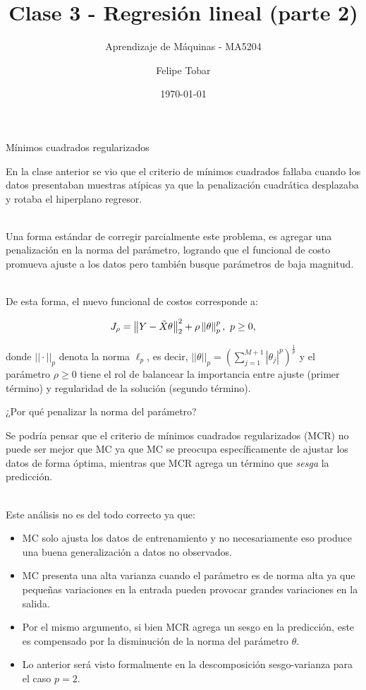 \documentclass[9pt]{beamer}
\title{Clase 3 - Regresión lineal (parte 2)}
\subtitle{Aprendizaje de Máquinas - MA5204}
\date{\today}
\author{Felipe Tobar}
\institute{Department of Mathematical Engineering \&\\ Center for Mathematical Modelling\\Universidad de Chile}
\begin{document}
\begin{frame}
  \titlepage
\end{frame}

\begin{frame}{Mínimos cuadrados regularizados}

En la clase anterior se vio que el criterio de mínimos cuadrados fallaba cuando los datos presentaban muestras atípicas ya que la penalización cuadrática desplazaba y rotaba el hiperplano regresor.\\~\ \pause

Una forma estándar de corregir parcialmente este problema, es agregar una penalización en la norma del parámetro, logrando que el funcional de costo promueva ajuste a los datos pero también busque parámetros de baja magnitud.\\~\ \pause

De esta forma, el nuevo funcional de costos corresponde a:

\begin{equation*}
	J_\rho = \left\lVert Y-\tilde{X}\theta\right\rVert_2^2 + \rho\left\lVert\theta\right\rVert_p^p,\ p\geq 0,
\end{equation*}

donde $||\cdot||_p$ denota la norma $\ell_p$, es decir, $||\theta||_p=\left(\sum\limits_{j=1}^{M+1}|\theta_j|^p\right)^\frac{1}{p}$ y el parámetro $\rho\geq0$ tiene el rol de balancear la importancia entre ajuste (primer término) y regularidad de la solución (segundo término).
	 
\end{frame}

\begin{frame}{¿Por qué penalizar la norma del parámetro?}

Se podría pensar que el criterio de mínimos cuadrados regularizados (MCR) no puede ser mejor que MC ya que MC se preocupa específicamente de ajustar los datos de forma óptima, mientras que MCR agrega un término que \emph{sesga} la predicción.\\~\ \pause

Este análisis no es del todo correcto ya que: 

\begin{itemize}
	\item MC solo ajusta los datos de entrenamiento y no necesariamente eso produce una buena generalización a datos no observados.\pause
	\item MC presenta una alta varianza cuando el parámetro es de norma alta ya que pequeñas variaciones en la entrada pueden provocar grandes variaciones en la salida.\pause
	\item Por el mismo argumento, si bien MCR agrega un sesgo en la predicción, este es compensado por la disminución de la norma del parámetro $\theta$.\pause
	\item Lo anterior será visto formalmente en la descomposición sesgo-varianza para el caso $p=2$.
\end{itemize}
	
\end{frame}
\end{document}
